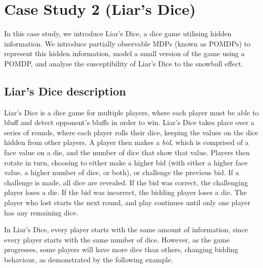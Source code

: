 \chapter{Case Study 2 (Liar's Dice)}
\label{cs2:liars_dice}

In this case study, we introduce Liar's Dice, a dice game utilising hidden information. We introduce partially observable MDPs (known as POMDPs) to represent this hidden information, model a small version of the game using a POMDP, and analyse the susceptibility of Liar's Dice to the snowball effect.

\section{Liar's Dice description}
\label{cs2:liars_dice_description}
Liar's Dice is a dice game for multiple players, where each player must be able to bluff and detect opponent's bluffs in order to win. Liar's Dice takes place over a series of rounds, where each player rolls their dice, keeping the values on the dice hidden from other players. A player then makes a \emph{bid}, which is comprised of a face value on a die, and the number of dice that show that value. Players then rotate in turn, choosing to either make a higher bid (with either a higher face value, a higher number of dice, or both), or challenge the previous bid. If a challenge is made, all dice are revealed. If the bid was correct, the challenging player loses a die. If the bid was incorrect, the bidding player loses a die. The player who lost starts the next round, and play continues until only one player has any remaining dice.

In Liar's Dice, every player starts with the same amount of information, since every player starts with the same number of dice. However, as the game progresses, some players will have more dice than others, changing bidding behaviour, as demonstrated by the following example.

